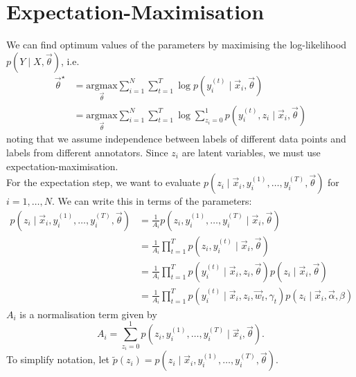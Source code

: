 \documentclass[a4paper]{article}
\begin{document}
    \section{Expectation-Maximisation}

        We can find optimum values of the parameters by maximising the log-likelihood $p(Y \mid X, \vec \theta)$, i.e.
        \begin{align*}
            \vec \theta^\star &= \underset{\vec \theta}{\mbox{argmax}} \sum_{i = 1}^N \sum_{t = 1}^T \log p(y_i^{(t)} \mid \vec x_i, \vec \theta)\\
                &= \underset{\vec \theta}{\mbox{argmax}} \sum_{i = 1}^N \sum_{t = 1}^T \log \sum_{z_i = 0}^1 p(y_i^{(t)}, z_i \mid \vec x_i, \vec \theta)
        \end{align*}
        noting that we assume independence between labels of different data points and labels from different annotators. Since $z_i$ are latent variables, we must use expectation-maximisation.\\

        For the expectation step, we want to evaluate $p(z_i \mid \vec x_i, y_i^{(1)}, \dots, y_i^{(T)}, \vec \theta)$ for $i = 1, \dots, N$. We can write this in terms of the parameters:
        \begin{align*}
            p(z_i \mid \vec x_i, y_i^{(1)}, \dots, y_i^{(T)}, \vec \theta) &= \frac{1}{A_i} p(z_i, y_i^{(1)}, \dots, y_i^{(T)} \mid \vec x_i, \vec \theta)\\
                &= \frac{1}{A_i} \prod_{t = 1}^T p(z_i, y_i^{(t)} \mid \vec x_i, \vec \theta)\\
                &= \frac{1}{A_i} \prod_{t = 1}^T p(y_i^{(t)} \mid \vec x_i, z_i, \vec \theta) p(z_i \mid \vec x_i, \vec \theta)\\
                &= \frac{1}{A_i} \prod_{t = 1}^T p(y_i^{(t)} \mid \vec x_i, z_i, \vec w_t, \gamma_t) p(z_i \mid \vec x_i, \vec \alpha, \beta)
        \end{align*}
        $A_i$ is a normalisation term given by
        \[
            A_i = \sum_{z_i = 0}^1 p(z_i, y_i^{(1)}, \dots, y_i^{(T)} \mid \vec x_i, \vec \theta).
        \]
        To simplify notation, let $\tilde p(z_i) = p(z_i \mid \vec x_i, y_i^{(1)}, \dots, y_i^{(T)}, \vec \theta)$.\\
\end{document}
